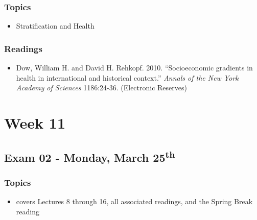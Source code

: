 \documentclass[]{book}
\providecommand{\tightlist}{%
  \setlength{\itemsep}{0pt}\setlength{\parskip}{0pt}}
\begin{document}
\hypertarget{topics-18}{%
\subsubsection*{Topics}\label{topics-18}}

\begin{itemize}
\tightlist
\item
  Stratification and Health
\end{itemize}

\hypertarget{readings-17}{%
\subsubsection*{Readings}\label{readings-17}}

\begin{itemize}
\tightlist
\item
  Dow, William H. and David H. Rehkopf. 2010. ``Socioeconomic gradients in health in international and historical context.'' \emph{Annals of the New York Academy of Sciences} 1186:24-36. (Electronic Reserves)
\end{itemize}

\hypertarget{week-11}{%
\section*{Week 11}\label{week-11}}

\hypertarget{exam-02---monday-march-25th}{%
\subsection*{\texorpdfstring{Exam 02 - Monday, March 25\textsuperscript{th}}{Exam 02 - Monday, March 25th}}\label{exam-02---monday-march-25th}}

\hypertarget{topics-19}{%
\subsubsection*{Topics}\label{topics-19}}

\begin{itemize}
\tightlist
\item
  covers Lectures 8 through 16, all associated readings, and the Spring Break reading
\end{itemize}
\end{document}
